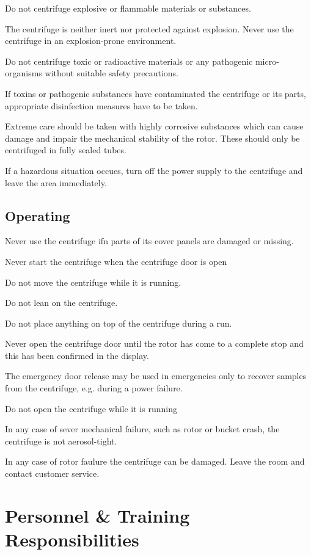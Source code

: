 \documentclass[12pt]{../SOP3_beta}
\begin{document}
\NP Do not centrifuge explosive or flammable materials or substances.

\NP The centrifuge is neither inert nor protected against explosion. Never use the centrifuge in an explosion-prone environment.

\NP Do not centrifuge toxic or radioactive materials or any pathogenic micro-organisms without suitable safety precautions.

\NP If toxins or pathogenic substances have contaminated the centrifuge or its parts, appropriate disinfection measures have to be taken.

\NP Extreme care should be taken with highly corrosive substances which can cause damage and impair the mechanical stability of the rotor. These should only be centrifuged in fully sealed tubes.

\NP If a hazardous situation occues, turn off the power supply to the centrifuge and leave the area immediately.

\subsection {Operating}

\NP Never use the centrifuge ifn parts of its cover panels are damaged or missing.

\NP Never start the centrifuge when the centrifuge door is open

\NP Do not move the centrifuge while it is running.

\NP Do not lean on the centrifuge.

\NP Do not place anything on top of the centrifuge during a run.

\NP Never open the centrifuge door until the rotor has come to a complete stop and this has been confirmed in the display.

\NP The emergency door release may be used in emergencies only to recover samples from the centrifuge, e.g. during a power failure.

\NP Do not open the centrifuge while it is running

\NP In any case of sever mechanical failure, such as rotor or bucket crash, the centrifuge is not aerosol-tight.

\NP In any case of rotor faulure the centrifuge can be damaged. Leave the room and contact customer service.

\section{Personnel \& Training Responsibilities}
\end{document}
